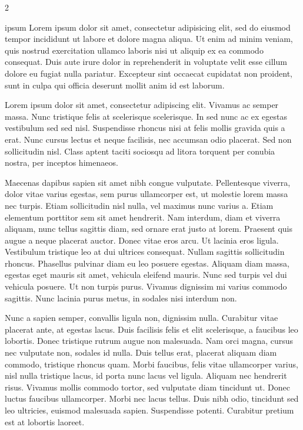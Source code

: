\documentclass[9pt,]{book}
\begin{document}
\begin {multicols}{2}

ipsum Lorem ipsum dolor sit amet, consectetur adipisicing elit, sed do
eiusmod tempor incididunt ut labore et dolore magna aliqua. Ut enim ad
minim veniam, quis nostrud exercitation ullamco laboris nisi ut aliquip
ex ea commodo consequat. Duis aute irure dolor in reprehenderit in
voluptate velit esse cillum dolore eu fugiat nulla pariatur. Excepteur
sint occaecat cupidatat non proident, sunt in culpa qui officia deserunt
mollit anim id est laborum.

Lorem ipsum dolor sit amet, consectetur adipiscing elit. Vivamus ac
semper massa. Nunc tristique felis at scelerisque scelerisque. In sed
nunc ac ex egestas vestibulum sed sed nisl. Suspendisse rhoncus nisi at
felis mollis gravida quis a erat. Nunc cursus lectus et neque facilisis,
nec accumsan odio placerat. Sed non sollicitudin nisl. Class aptent
taciti sociosqu ad litora torquent per conubia nostra, per inceptos
himenaeos.

Maecenas dapibus sapien sit amet nibh congue vulputate. Pellentesque
viverra, dolor vitae varius egestas, sem purus ullamcorper est, ut
molestie lorem massa nec turpis. Etiam sollicitudin nisl nulla, vel
maximus nunc varius a. Etiam elementum porttitor sem sit amet hendrerit.
Nam interdum, diam et viverra aliquam, nunc tellus sagittis diam, sed
ornare erat justo at lorem. Praesent quis augue a neque placerat auctor.
Donec vitae eros arcu. Ut lacinia eros ligula. Vestibulum tristique leo
at dui ultrices consequat. Nullam sagittis sollicitudin rhoncus.
Phasellus pulvinar diam eu leo posuere egestas. Aliquam diam massa,
egestas eget mauris sit amet, vehicula eleifend mauris. Nunc sed turpis
vel dui vehicula posuere. Ut non turpis purus. Vivamus dignissim mi
varius commodo sagittis. Nunc lacinia purus metus, in sodales nisi
interdum non.

Nunc a sapien semper, convallis ligula non, dignissim nulla. Curabitur
vitae placerat ante, at egestas lacus. Duis facilisis felis et elit
scelerisque, a faucibus leo lobortis. Donec tristique rutrum augue non
malesuada. Nam orci magna, cursus nec vulputate non, sodales id nulla.
Duis tellus erat, placerat aliquam diam commodo, tristique rhoncus quam.
Morbi faucibus, felis vitae ullamcorper varius, nisl nulla tristique
lacus, id porta nunc lacus vel ligula. Aliquam nec hendrerit risus.
Vivamus mollis commodo tortor, sed vulputate diam tincidunt ut. Donec
luctus faucibus ullamcorper. Morbi nec lacus tellus. Duis nibh odio,
tincidunt sed leo ultricies, euismod malesuada sapien. Suspendisse
potenti. Curabitur pretium est at lobortis laoreet.


\end{multicols}
\end{document}
